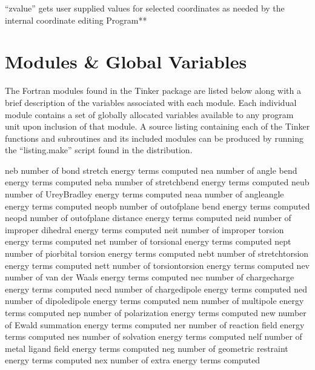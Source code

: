 \documentclass[letterpaper,11pt,english]{sphinxmanual}
\begin{document}

“zvalue” gets user supplied values for selected coordinates as needed by the internal coordinate editing Program**


\chapter{Modules \& Global Variables}
\label{\detokenize{text/modules:modules-global-variables}}\label{\detokenize{text/modules::doc}}
The Fortran modules found in the Tinker package are listed below along with a brief description of the variables associated with each module. Each individual module contains a set of globally allocated variables available to any program unit upon inclusion of that module. A source listing containing each of the Tinker functions and subroutines and its included modules can be produced by running the “listing.make” script found in the distribution.


\begin{sphinxVerbatim}[commandchars=\\\{\}]
neb             number of bond stretch energy terms computed
nea             number of angle bend energy terms computed
neba            number of stretch\PYGZhy{}bend energy terms computed
neub            number of Urey\PYGZhy{}Bradley energy terms computed
neaa            number of angle\PYGZhy{}angle energy terms computed
neopb           number of out\PYGZhy{}of\PYGZhy{}plane bend energy terms computed
neopd           number of out\PYGZhy{}of\PYGZhy{}plane distance energy terms computed
neid            number of improper dihedral energy terms computed
neit            number of improper torsion energy terms computed
net             number of torsional energy terms computed
nept            number of pi\PYGZhy{}orbital torsion energy terms computed
nebt            number of stretch\PYGZhy{}torsion energy terms computed
nett            number of torsion\PYGZhy{}torsion energy terms computed
nev             number of van der Waals energy terms computed
nec             number of charge\PYGZhy{}charge energy terms computed
necd            number of charge\PYGZhy{}dipole energy terms computed
ned             number of dipole\PYGZhy{}dipole energy terms computed
nem             number of multipole energy terms computed
nep             number of polarization energy terms computed
new             number of Ewald summation energy terms computed
ner             number of reaction field energy terms computed
nes             number of solvation energy terms computed
nelf            number of metal ligand field energy terms computed
neg             number of geometric restraint energy terms computed
nex             number of extra energy terms computed
\end{sphinxVerbatim}
\end{document}
